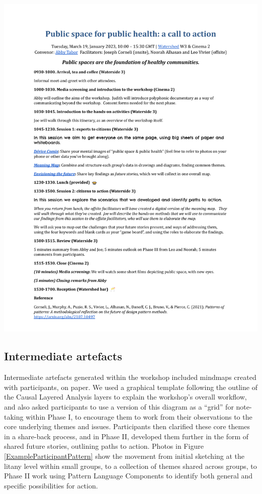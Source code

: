 \documentclass[acmlarge,timestamp]{acmart}
\begin{document}
\begin{mdframed}[backgroundcolor=blue!50,linecolor=blue!50]
  \noindent\includegraphics[width=\textwidth,trim={1cm 3.2cm 1cm 4.5cm},clip=true]{bristol}
\end{mdframed}

\subsection{Intermediate artefacts}

Intermediate artefacts generated within the workshop included mindmaps
created with participants, on paper.  We used a graphical template
following the outline of the Causal Layered Analysis layers to explain
the workshop’s overall workflow, and also asked participants to use a
version of this diagram as a “grid” for note-taking within Phase I, to
encourage them to work from their observations to the core underlying
themes and issues.  Participants then clarified these core themes in a
share-back process, and in Phase II, developed them further in the
form of shared future stories, outlining paths to action.  Photos in
Figure \ref{ExampleParticipantPattern} show the movement from initial
sketching at the litany level within small groups, to a collection of
themes shared across groups, to Phase II work using {\sc Pattern
  Language Components} to identify both general and specific
possibilities for action.
\end{document}
